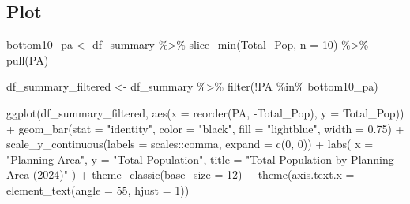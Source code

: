 \documentclass[
  letterpaper,
  DIV=11,
  numbers=noendperiod]{scrartcl}
\newenvironment{Shaded}{\begin{snugshade}}{\end{snugshade}}
\newcommand{\AttributeTok}[1]{\textcolor[rgb]{0.40,0.45,0.13}{#1}}
\newcommand{\DecValTok}[1]{\textcolor[rgb]{0.68,0.00,0.00}{#1}}
\newcommand{\FloatTok}[1]{\textcolor[rgb]{0.68,0.00,0.00}{#1}}
\newcommand{\FunctionTok}[1]{\textcolor[rgb]{0.28,0.35,0.67}{#1}}
\newcommand{\NormalTok}[1]{\textcolor[rgb]{0.00,0.23,0.31}{#1}}
\newcommand{\OtherTok}[1]{\textcolor[rgb]{0.00,0.23,0.31}{#1}}
\newcommand{\SpecialCharTok}[1]{\textcolor[rgb]{0.37,0.37,0.37}{#1}}
\newcommand{\StringTok}[1]{\textcolor[rgb]{0.13,0.47,0.30}{#1}}
\begin{document}
\subsection{Plot}\label{plot}

\begin{Shaded}
\begin{Highlighting}[]
\NormalTok{bottom10\_pa }\OtherTok{\textless{}{-}}\NormalTok{ df\_summary }\SpecialCharTok{\%\textgreater{}\%}
  \FunctionTok{slice\_min}\NormalTok{(Total\_Pop, }\AttributeTok{n =} \DecValTok{10}\NormalTok{) }\SpecialCharTok{\%\textgreater{}\%}
  \FunctionTok{pull}\NormalTok{(PA)}

\NormalTok{df\_summary\_filtered }\OtherTok{\textless{}{-}}\NormalTok{ df\_summary }\SpecialCharTok{\%\textgreater{}\%}
  \FunctionTok{filter}\NormalTok{(}\SpecialCharTok{!}\NormalTok{PA }\SpecialCharTok{\%in\%}\NormalTok{ bottom10\_pa)}

\FunctionTok{ggplot}\NormalTok{(df\_summary\_filtered, }\FunctionTok{aes}\NormalTok{(}\AttributeTok{x =} \FunctionTok{reorder}\NormalTok{(PA, }\SpecialCharTok{{-}}\NormalTok{Total\_Pop), }\AttributeTok{y =}\NormalTok{ Total\_Pop)) }\SpecialCharTok{+}
  \FunctionTok{geom\_bar}\NormalTok{(}\AttributeTok{stat =} \StringTok{"identity"}\NormalTok{, }\AttributeTok{color =} \StringTok{"black"}\NormalTok{, }\AttributeTok{fill =} \StringTok{"lightblue"}\NormalTok{, }\AttributeTok{width =} \FloatTok{0.75}\NormalTok{) }\SpecialCharTok{+}
  \FunctionTok{scale\_y\_continuous}\NormalTok{(}\AttributeTok{labels =}\NormalTok{ scales}\SpecialCharTok{::}\NormalTok{comma, }\AttributeTok{expand =} \FunctionTok{c}\NormalTok{(}\DecValTok{0}\NormalTok{, }\DecValTok{0}\NormalTok{)) }\SpecialCharTok{+}  
  \FunctionTok{labs}\NormalTok{(}
    \AttributeTok{x =} \StringTok{"Planning Area"}\NormalTok{,}
    \AttributeTok{y =} \StringTok{"Total Population"}\NormalTok{,}
    \AttributeTok{title =} \StringTok{"Total Population by Planning Area (2024)"}
\NormalTok{  ) }\SpecialCharTok{+}
  \FunctionTok{theme\_classic}\NormalTok{(}\AttributeTok{base\_size =} \DecValTok{12}\NormalTok{) }\SpecialCharTok{+}
  \FunctionTok{theme}\NormalTok{(}\AttributeTok{axis.text.x =} \FunctionTok{element\_text}\NormalTok{(}\AttributeTok{angle =} \DecValTok{55}\NormalTok{, }\AttributeTok{hjust =} \DecValTok{1}\NormalTok{))}
\end{Highlighting}
\end{Shaded}
\end{document}
